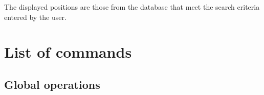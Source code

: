 \documentclass[letterpaper,10pt,english]{sphinxmanual}
\begin{document}
\sphinxAtStartPar
The displayed positions are those from the database that meet the search criteria entered by the user.

\sphinxstepscope


\section{List of commands}
\label{\detokenize{cmd_mode:liste-des-commandes}}\label{\detokenize{cmd_mode:cmd-mode}}\label{\detokenize{cmd_mode::doc}}

\subsection{Global operations}
\label{\detokenize{cmd_mode:operations-globales}}\label{\detokenize{cmd_mode:cmd-global}}
\end{document}
